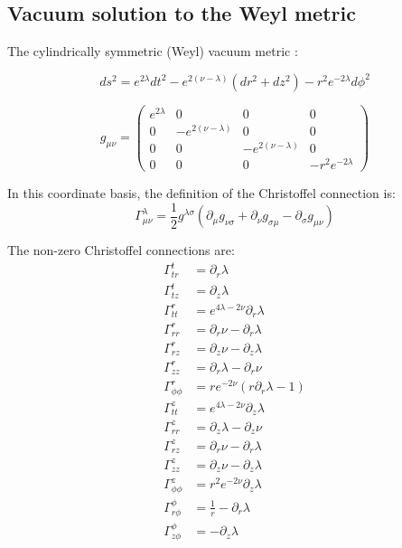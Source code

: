 \documentclass[12pt]{article}
\begin{document}
\begin{appendices}
\section{Vacuum solution to the Weyl metric}

The cylindrically symmetric (Weyl) vacuum metric \cite{synge_relativity}:

\begin{equation}
  ds^{2}=e^{2\lambda}dt^{2}-e^{2\left(\nu-\lambda\right)}\left(dr^{2}+dz^{2}\right)-r^{2}e^{-2\lambda}d\phi^{2}
\end{equation}

\begin{equation}
g_{\mu\nu}=\left(\begin{array}{cccc}
e^{2\lambda} & 0 & 0 & 0\\
0 & -e^{2\left(\nu-\lambda\right)} & 0 & 0\\
0 & 0 & -e^{2\left(\nu-\lambda\right)} & 0\\
0 & 0 & 0 & -r^{2}e^{-2\lambda}
\end{array}\right)\label{eq:general-axisymmetric-static-matrix-metric}
\end{equation}

In this coordinate basis, the definition of the Christoffel connection is: \cite{carroll_spacetime_2003}
\begin{equation}
\Gamma_{\mu\nu}^{\lambda}=\frac{1}{2}g^{\lambda\sigma}\left(\partial_{\mu}g_{\nu\sigma}+\partial_{\nu}g_{\sigma\mu}-\partial_{\sigma}g_{\mu\nu}\right)
\end{equation}

The non-zero Christoffel connections are:
\begin{equation}
\begin{aligned}
\Gamma^{t}_{tr}&=\partial_{r}\lambda\\
\Gamma^{t}_{tz}&=\partial_{z}\lambda\\
\Gamma^{r}_{tt}&=e^{4\lambda-2\nu}\partial_{r}\lambda\\
\Gamma^{r}_{rr}&=\partial_{r}\nu-\partial_{r}\lambda\\
\Gamma^{r}_{rz}&=\partial_{z}\nu-\partial_{z}\lambda\\
\Gamma^{r}_{zz}&=\partial_{r}\lambda-\partial_{r}\nu\\
\Gamma^{r}_{\phi\phi}&=re^{-2\nu}\left(r\partial_{r}\lambda-1\right)\\
\Gamma^{z}_{tt}&=e^{4\lambda-2\nu}\partial_{z}\lambda\\
\Gamma^{z}_{rr}&=\partial_{z}\lambda-\partial_{z}\nu\\
\Gamma^{z}_{rz}&=\partial_{r}\nu-\partial_{r}\lambda\\
\Gamma^{z}_{zz}&=\partial_{z}\nu-\partial_{z}\lambda\\
\Gamma^{z}_{\phi\phi}&=r^{2}e^{-2\nu}\partial_{z}\lambda\\
\Gamma^{\phi}_{r\phi}&=\frac{1}{r}-\partial_{r}\lambda\\
\Gamma^{\phi}_{z\phi}&=-\partial_{z}\lambda\\
\end{aligned}
\label{eq:christoffel-connections}
\end{equation}


\end{appendices}
\end{document}
